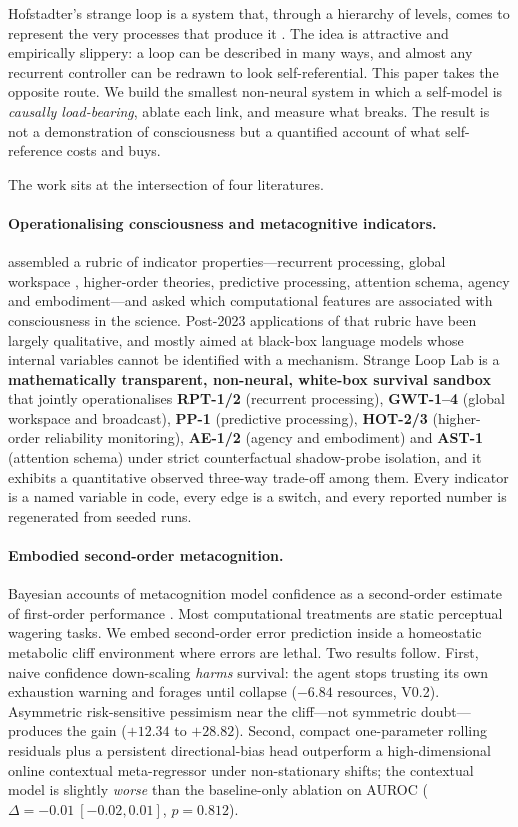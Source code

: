 \documentclass{article}
\begin{document}
Hofstadter's strange loop is a system that, through a hierarchy of levels, comes to represent the very processes that produce it \citep{hofstadter1979geb,hofstadter2007loop}. The idea is attractive and empirically slippery: a loop can be described in many ways, and almost any recurrent controller can be redrawn to look self-referential. This paper takes the opposite route. We build the smallest non-neural system in which a self-model is \emph{causally load-bearing}, ablate each link, and measure what breaks. The result is not a demonstration of consciousness but a quantified account of what self-reference costs and buys.

The work sits at the intersection of four literatures.

\paragraph{Operationalising consciousness and metacognitive indicators.}
\citet{butlin2025indicators} assembled a rubric of indicator properties---recurrent processing, global workspace \citep{baars1988cognitive}, higher-order theories, predictive processing, attention schema, agency and embodiment---and asked which computational features are associated with consciousness in the science. Post-2023 applications of that rubric have been largely qualitative, and mostly aimed at black-box language models whose internal variables cannot be identified with a mechanism. Strange Loop Lab is a \textbf{mathematically transparent, non-neural, white-box survival sandbox} that jointly operationalises \textbf{RPT-1/2} (recurrent processing), \textbf{GWT-1--4} (global workspace and broadcast), \textbf{PP-1} (predictive processing), \textbf{HOT-2/3} (higher-order reliability monitoring), \textbf{AE-1/2} (agency and embodiment) and \textbf{AST-1} (attention schema) under strict counterfactual shadow-probe isolation, and it exhibits a quantitative observed three-way trade-off among them. Every indicator is a named variable in code, every edge is a switch, and every reported number is regenerated from seeded runs.

\paragraph{Embodied second-order metacognition.}
Bayesian accounts of metacognition model confidence as a second-order estimate of first-order performance \citep{fleming2017self,pasquali2010know}. Most computational treatments are static perceptual wagering tasks. We embed second-order error prediction inside a homeostatic metabolic cliff environment where errors are lethal. Two results follow. First, naive confidence down-scaling \emph{harms} survival: the agent stops trusting its own exhaustion warning and forages until collapse ($-6.84$ resources, V0.2). Asymmetric risk-sensitive pessimism near the cliff---not symmetric doubt---produces the gain ($+12.34$ to $+28.82$). Second, compact one-parameter rolling residuals plus a persistent directional-bias head outperform a high-dimensional online contextual meta-regressor under non-stationary shifts; the contextual model is slightly \emph{worse} than the baseline-only ablation on AUROC ($\Delta=-0.01\ [-0.02,0.01]$, $p=0.812$).
\end{document}
